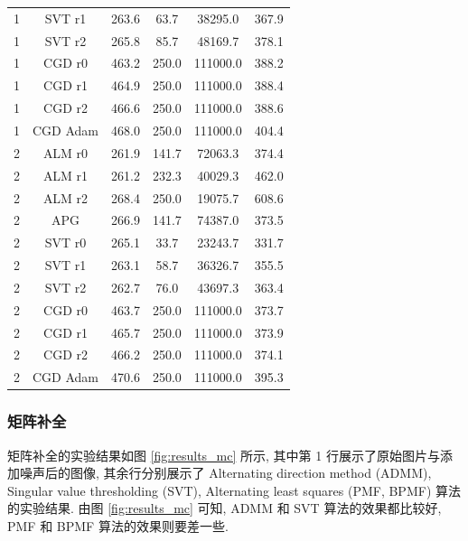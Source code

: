 \documentclass[12pt]{article}
\begin{document}
\begin{table}[!htbp]
\begin{tabular}{cccccc}
    1     & SVT r1    & 263.6    & 63.7        & 38295.0     & 367.9         \\
    1     & SVT r2    & 265.8    & 85.7        & 48169.7     & 378.1         \\
    1     & CGD r0    & 463.2    & 250.0       & 111000.0    & 388.2         \\
    1     & CGD r1    & 464.9    & 250.0       & 111000.0    & 388.4         \\
    1     & CGD r2    & 466.6    & 250.0       & 111000.0    & 388.6         \\
    1     & CGD Adam  & 468.0    & 250.0       & 111000.0    & 404.4         \\
    2     & ALM r0    & 261.9    & 141.7       & 72063.3     & 374.4         \\
    2     & ALM r1    & 261.2    & 232.3       & 40029.3     & 462.0         \\
    2     & ALM r2    & 268.4    & 250.0       & 19075.7     & 608.6         \\
    2     & APG       & 266.9    & 141.7       & 74387.0     & 373.5         \\
    2     & SVT r0    & 265.1    & 33.7        & 23243.7     & 331.7         \\
    2     & SVT r1    & 263.1    & 58.7        & 36326.7     & 355.5         \\
    2     & SVT r2    & 262.7    & 76.0        & 43697.3     & 363.4         \\
    2     & CGD r0    & 463.7    & 250.0       & 111000.0    & 373.7         \\
    2     & CGD r1    & 465.7    & 250.0       & 111000.0    & 373.9         \\
    2     & CGD r2    & 466.2    & 250.0       & 111000.0    & 374.1         \\
    2     & CGD Adam  & 470.6    & 250.0       & 111000.0    & 395.3        \\
    \bottomrule
  \end{tabular}
\end{table}

\subsubsection{矩阵补全}

矩阵补全的实验结果如图 \ref{fig:results_mc} 所示, 其中第 1 行展示了原始图片与添加噪声后的图像, 其余行分别展示了 Alternating direction method (ADMM), Singular value thresholding (SVT), Alternating least squares (PMF, BPMF) 算法的实验结果. 由图 \ref{fig:results_mc} 可知, ADMM 和 SVT 算法的效果都比较好, PMF 和 BPMF 算法的效果则要差一些.
\end{document}
